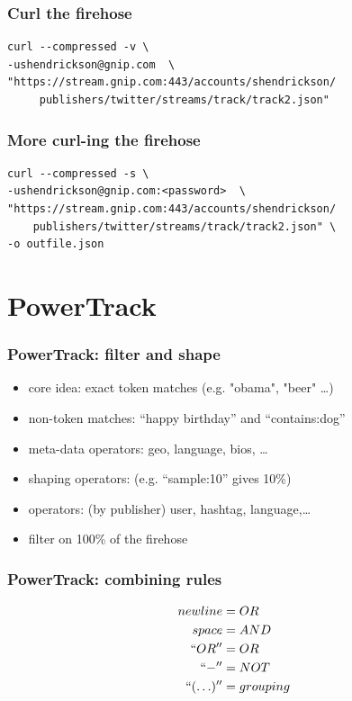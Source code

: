\documentclass{beamer}
\begin{document}
\begin{frame}[fragile]
\frametitle{Curl the firehose}
\begin{verbatim}
curl --compressed -v \
-ushendrickson@gnip.com  \
"https://stream.gnip.com:443/accounts/shendrickson/
     publishers/twitter/streams/track/track2.json"
\end{verbatim}
\end{frame}

\begin{frame}[fragile]
\frametitle{More curl-ing the firehose}
\begin{verbatim}
curl --compressed -s \
-ushendrickson@gnip.com:<password>  \
"https://stream.gnip.com:443/accounts/shendrickson/
    publishers/twitter/streams/track/track2.json" \
-o outfile.json
\end{verbatim}
\end{frame}

\section{PowerTrack}

\begin{frame}\frametitle{PowerTrack: filter and shape}
\begin{itemize}
\item core idea: exact token matches (e.g. "obama", "beer" \ldots)
\item non-token matches: ``happy birthday'' and ``contains:dog''
\item meta-data operators: geo, language, bios, \ldots
\item shaping operators: (e.g. ``sample:10'' gives 10\%)
\item operators: (by publisher) user, hashtag, language,\ldots
\item filter on 100\% of the firehose
\end{itemize}
\end{frame}


\begin{frame}\frametitle{PowerTrack: combining rules}
\begin{equation*}
\begin{aligned}
        newline &= OR \\
        space &= AND \\
        ``OR'' &= OR \\
        ``-'' &= NOT \\
        ``(\ldots)'' &= grouping
\end{aligned}
\end{equation*}
\end{frame}
\end{document}
